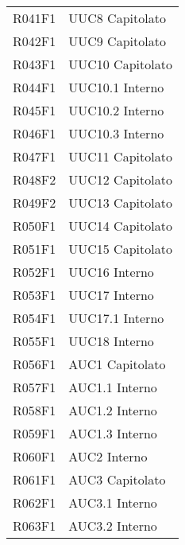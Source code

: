 \documentclass[../analisi-dei-requisiti.tex]{subfiles}
\begin{document}
\begin{longtable}[H]{ p{4cm} | p{4cm} }
  R041F1                               & UUC8 Capitolato               \\
  R042F1                               & UUC9 Capitolato               \\
  R043F1                               & UUC10 Capitolato              \\
  R044F1                               & UUC10.1 Interno               \\
  R045F1                               & UUC10.2 Interno               \\
  R046F1                               & UUC10.3 Interno               \\
  R047F1                               & UUC11 Capitolato              \\
  R048F2                               & UUC12 Capitolato              \\
  R049F2                               & UUC13 Capitolato            \\
  R050F1                               & UUC14 Capitolato              \\
  R051F1                               & UUC15 Capitolato              \\
  R052F1                               & UUC16 Interno                 \\
  R053F1                               & UUC17 Interno                 \\
  R054F1                               & UUC17.1 Interno               \\
  R055F1                               & UUC18 Interno                 \\
  R056F1                               & AUC1 Capitolato               \\
  R057F1                               & AUC1.1 Interno                \\
  R058F1                               & AUC1.2 Interno                \\
  R059F1                               & AUC1.3 Interno                \\
  R060F1                               & AUC2 Interno                  \\
  R061F1                               & AUC3 Capitolato               \\
  R062F1                               & AUC3.1 Interno                \\
  R063F1                               & AUC3.2 Interno                \\

\end{longtable}
\end{document}
